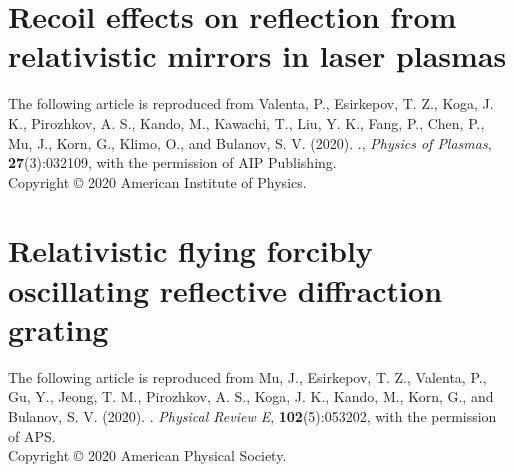 \documentclass[10pt, a4paper, twoside, openright]{report}
\newcommand{\link}[3][blue]{\href{#2}{\color{#1}{#3}}}%
\begin{document}
\mbox{}
\thispagestyle{empty}
\newpage

\section{Recoil effects on reflection from relativistic mirrors in laser plasmas \label{sec:paper_3}}

The following article is reproduced from Valenta, P., Esirkepov, T. Z., Koga, J. K., Pirozhkov, A. S., Kando, M., Kawachi, T., Liu, Y. K., Fang, P., Chen, P., Mu, J., Korn, G., Klimo, O., and Bulanov, S. V. (2020). \link{http://dx.doi.org/10.1063/1.5142084}{Recoil effects on reflection from relativistic mirrors in laser plasmas}., \textit{Physics of Plasmas}, \textbf{27}(3):032109, with the permission of AIP Publishing. \\

\noindent Copyright {\copyright} {2020} {American Institute of Physics}.

\newpage
\mbox{}
\thispagestyle{empty}

\newpage


\section{Relativistic flying forcibly oscillating reflective diffraction grating \label{sec:paper_4}}

The following article is reproduced from Mu, J., Esirkepov, T. Z., Valenta, P., Gu, Y., Jeong, T. M., Pirozhkov, A. S., Koga, J. K., Kando, M., Korn, G., and Bulanov, S. V. (2020). \link{http://dx.doi.org/10.1103/PhysRevE.102.053202}{Relativistic flying forcibly oscillating reflective diffraction grating}. \textit{Physical Review E}, \textbf{102}(5):053202, with the permission of APS. \\

\noindent Copyright {\copyright} {2020} {American Physical Society}.

\newpage
\mbox{}
\thispagestyle{empty}

\newpage


%

%
\end{document}
